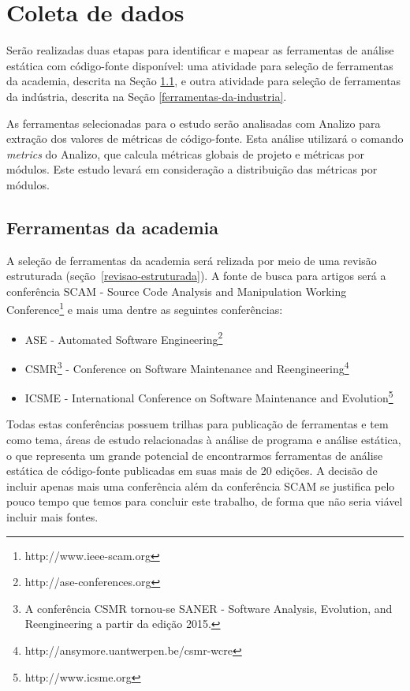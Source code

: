 \section{Coleta de dados} \label{coleta}

Serão realizadas duas etapas para identificar e mapear as ferramentas de
análise estática com código-fonte disponível: uma atividade para seleção de
ferramentas da academia, descrita na Seção \ref{ferramentas-da-academia}, e
outra atividade para seleção de ferramentas da indústria, descrita na Seção
\ref{ferramentas-da-industria}.

As ferramentas selecionadas para o estudo serão analisadas com Analizo para
extração dos valores de métricas de código-fonte.  Esta análise utilizará o
comando {\it metrics} do Analizo, que calcula métricas globais de projeto e
métricas por módulos. Este estudo levará em consideração a distribuição das
métricas por módulos.

\subsection{Ferramentas da academia} \label{ferramentas-da-academia}

A seleção de ferramentas da academia será relizada por meio de uma revisão
estruturada (seção~\ref{revisao-estruturada}). A fonte de busca para artigos
será a conferência SCAM - Source Code Analysis and Manipulation Working
Conference\footnote{http://www.ieee-scam.org} e mais uma dentre as seguintes
conferências:

\begin{itemize}
  \item ASE - Automated Software
    Engineering\footnote{http://ase-conferences.org}
  \item CSMR\footnote{A conferência CSMR tornou-se SANER - Software Analysis,
    Evolution, and Reengineering a partir da edição 2015.} - Conference on
    Software Maintenance and
    Reengineering\footnote{http://ansymore.uantwerpen.be/csmr-wcre}
  \item ICSME - International Conference on Software Maintenance and
    Evolution\footnote{http://www.icsme.org}
\end{itemize}

Todas estas conferências possuem trilhas para publicação de ferramentas e tem
como tema, áreas de estudo relacionadas à análise de programa e análise
estática, o que representa um grande potencial de encontrarmos ferramentas de
análise estática de código-fonte publicadas em suas mais de 20 edições. A
decisão de incluir apenas mais uma conferência além da conferência SCAM se
justifica pelo pouco tempo que temos para concluir este trabalho, de forma que
não seria viável incluir mais fontes.

